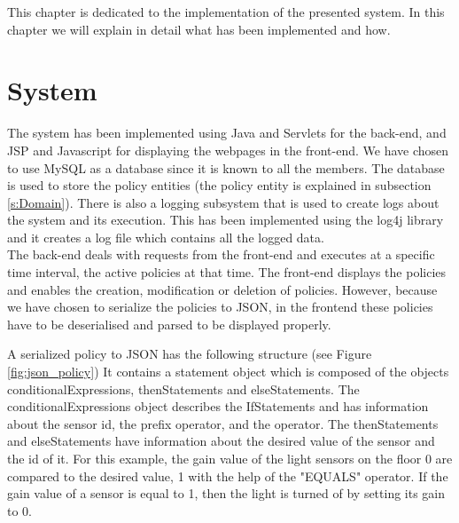 This chapter is dedicated to the implementation of the presented system. In this chapter we will explain in detail what has been implemented and how. 

\section{System}
The system has been implemented using Java and Servlets for the back-end, and JSP and Javascript for displaying the webpages in the front-end. We have chosen to use MySQL as a database since it is known to all the members. The database is used to store the policy entities (the policy entity is explained in subsection \ref{s:Domain}). There is also a logging subsystem that is used to create logs about the system and its execution. This has been implemented using the log4j library and it creates a log file which contains all the logged data. 
\\The back-end deals with requests from the front-end and executes at a specific time interval, the active policies at that time. The front-end displays the policies and enables the creation, modification or deletion of policies. However, because we have chosen to serialize the policies to JSON, in the frontend these policies have to be deserialised and parsed to be displayed properly. 

A serialized policy to JSON has the following structure (see Figure \ref{fig:json_policy})
It contains a statement object which is composed of the objects conditionalExpressions, thenStatements and elseStatements. 
The conditionalExpressions object describes the IfStatements and has information about the sensor id, the prefix operator, and the operator. The thenStatements and elseStatements have information about the desired value of the sensor and the id of it. 
For this example, the gain value of the light sensors on the floor 0 are compared to the desired value, 1 with the help of the "EQUALS" operator. If the gain value of a sensor is equal to 1, then the light is turned of by setting its gain to 0. 

